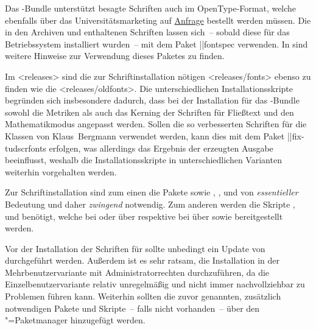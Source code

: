 Das \TUDScript-Bundle unterstützt besagte Schriften auch im OpenType-Format, 
welche ebenfalls über das Universitätsmarketing auf 
\href{https://tu-dresden.de/cd}{Anfrage} bestellt werden müssen. Die in den 
Archiven  und  enthaltenen 
Schriften lassen sich~-- sobald diese für das Betriebssystem installiert 
wurden~-- mit dem Paket \Package||{fontspec} verwenden. In  
sind weitere Hinweise zur Verwendung dieses Paketes zu finden.

Im \GitHubRepo<releases> sind die zur Schriftinstallation nötigen 
<releases/fonts> ebenso zu finden wie die
<releases/oldfonts>. Die 
unterschiedlichen Installationsskripte begründen sich insbesondere dadurch, 
dass bei der Installation für das \TUDScript-Bundle sowohl die Metriken als 
auch das Kerning der Schriften für Fließtext und den Mathematikmodus angepasst 
werden. Sollen die so verbesserten Schriften für die Klassen von Klaus~Bergmann 
verwendet werden, kann dies mit dem Paket \Package||{fix-tudscrfonts} erfolgen, 
was allerdings das Ergebnis der erzeugten Ausgabe beeinflusst, weshalb die 
Installationsskripte in unterschiedlichen Varianten weiterhin vorgehalten 
werden.

%
Zur Schriftinstallation sind zum einen die Pakete  sowie
, ,  und
 von \emph{essentieller} Bedeutung und daher \emph{zwingend} 
notwendig. Zum anderen werden die Skripte ,  und 
 benötigt, welche bei \TeXLive oder \MacTeX über 
 respektive bei \MiKTeX über  sowie 
 bereitgestellt werden. 

%
Vor der Installation der Schriften für \TUDScript sollte unbedingt ein Update 
von \MiKTeX durchgeführt werden. Außerdem ist es sehr ratsam, die Installation 
in der Mehrbenutzervariante mit Administratorrechten durchzuführen, da die 
Einzelbenutzervariante relativ unregelmäßig und nicht immer nachvollziehbar zu 
Problemen führen kann. Weiterhin sollten die zuvor genannten, zusätzlich 
notwendigen Pakete und Skripte~-- falls nicht vorhanden~-- über den 
\MiKTeX"=Paketmanager hinzugefügt werden.

